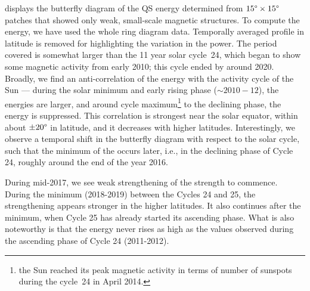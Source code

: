 \documentclass{aa}
\begin{document}

 displays the butterfly diagram of the 
QS
\fff
energy
determined
from $15\degree \times 15\degree$ patches that showed only weak, small-scale magnetic structures.
To compute the \fff 
energy, we have used the whole ring diagram data.
Temporally averaged profile in latitude is removed for highlighting the variation in the
\fff power. The period covered is somewhat larger than the 11 year solar cycle~24, which
began to show some magnetic activity from early 2010; this cycle ended by around 2020.
Broadly, we find an anti-correlation of the \fff 
energy with the activity cycle of the
Sun --- during the solar minimum and early rising phase ($\sim 2010-12$), the \fff 
energies
are larger, and around cycle maximum\footnote{the Sun reached its peak magnetic activity
in terms of number of sunspots during the cycle~24 in April 2014.} to the declining phase,
the \fff 
energy 
is suppressed.
This correlation is strongest near the solar equator, within about $\pm 20\degree$ in
latitude, and it decreases with higher latitudes.
Interestingly, we observe a temporal shift in the \fff butterfly diagram with respect to the
solar cycle, such that the minimum of the \fff occurs later, i.e., in the declining phase of
Cycle 24, roughly around the end of the year 2016.


During mid-2017, we see weak strengthening of the \fff strength to commence. During the minimum (2018-2019) between the Cycles 24 and 25, the strengthening appears stronger in the higher latitudes. It also continues after the minimum, when Cycle 25 has already started its ascending phase. What is also noteworthy is that the \fff 
energy
never rises as high as the values observed during the ascending phase of Cycle 24 (2011-2012).

\end{document}
